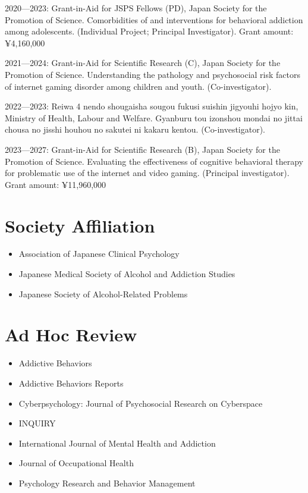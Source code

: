\documentclass[a4paper]{article}
\begin{document}
\begin{description}
	\item 2020---2023: Grant-in-Aid for JSPS Fellows (PD), Japan Society for the Promotion of Science. Comorbidities of and interventions for behavioral addiction among adolescents. (Individual Project; Principal Investigator). Grant amount: ¥4,160,000
	\item 2021---2024: Grant-in-Aid for Scientific Research (C), Japan Society for the Promotion of Science. Understanding the pathology and psychosocial risk factors of internet gaming disorder among children and youth. (Co-investigator).
	\item 2022---2023: Reiwa 4 nendo shougaisha sougou fukusi suishin jigyouhi hojyo kin, Ministry of Health, Labour and Welfare. Gyanburu tou izonshou mondai no jittai chousa no jisshi houhou no sakutei ni kakaru kentou. (Co-investigator).
	\item 2023---2027: Grant-in-Aid for Scientific Research (B), Japan Society for the Promotion of Science. Evaluating the effectiveness of cognitive behavioral therapy for problematic use of the internet and video gaming. (Principal investigator). Grant amount: ¥11,960,000
	\end{description}

\section{Society Affiliation}
\begin{itemize}
	\item Association of Japanese Clinical Psychology
	\item Japanese Medical Society of Alcohol and Addiction Studies
	\item Japanese Society of Alcohol-Related Problems
\end{itemize}

\section{Ad Hoc Review}
\begin{itemize}
	\item Addictive Behaviors
	\item Addictive Behaviors Reports
	\item Cyberpsychology: Journal of Psychosocial Research on Cyberspace 
	\item INQUIRY
	\item International Journal of Mental Health and Addiction
	\item Journal of Occupational Health
	\item Psychology Research and Behavior Management 
\end{itemize}
\end{document}
